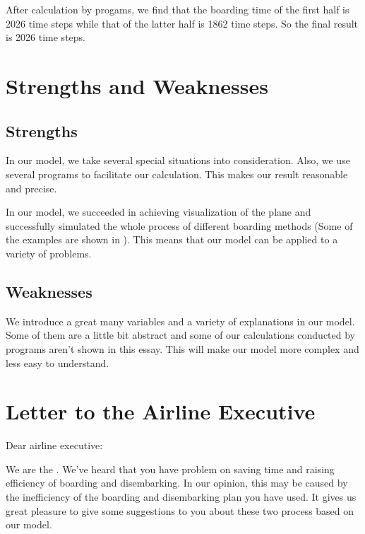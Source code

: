 \documentclass{article}
\begin{document}
	After calculation by progams, we find that the boarding time of the first half is 2026 time steps while that of the latter half is 1862 time steps. So the final result is 2026 time steps.
	\section{Strengths and Weaknesses}
	\subsection*{Strengths}
	\begin{itemize}

		In our model, we take several special situations into consideration. Also, we use several programs to facilitate our calculation. This makes our result reasonable and precise.

		In our model, we succeeded in achieving visualization of the plane and  successfully simulated the whole process of different boarding methods (Some of the examples are shown in ).  This means that our model can be applied to a variety of problems.
	\end{itemize}
	\subsection*{Weaknesses}
	\begin{itemize}
		\itembf{Complexity}

		We introduce a great many variables and a variety of explanations in our model. Some of them are a little bit abstract and some of our calculations conducted by programs aren't shown in this essay. This will make our model more complex and less easy to understand.
	\end{itemize}




	\newpage
	\section{Letter to the Airline Executive}
	\noindent Dear airline executive:

	We are the . We've heard that you have problem on saving time and raising efficiency of boarding and disembarking. In our opinion, this may be caused by the inefficiency of the boarding and disembarking plan you have used. It gives us great pleasure to give some suggestions to you  about these two process based on our model.
\end{document}
